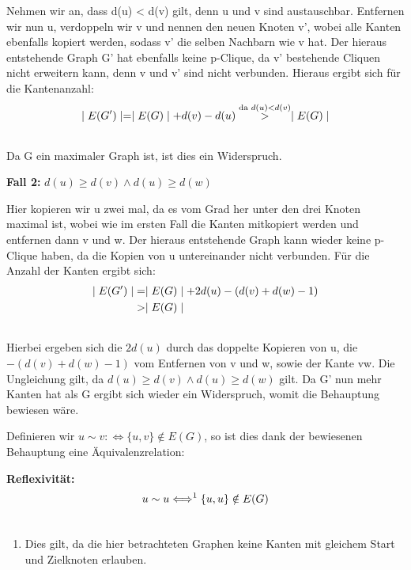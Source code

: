\documentclass[12pt, a4paper]{article}
\begin{document}
Nehmen wir an, dass d(u) \textless{} d(v) gilt, denn u und v sind austauschbar.
Entfernen wir nun u, verdoppeln wir v und nennen den neuen Knoten v', wobei alle Kanten ebenfalls kopiert werden, sodass v' die selben Nachbarn wie v hat. Der hieraus entstehende Graph G' hat ebenfalls keine p-Clique, da v' bestehende Cliquen nicht erweitern kann, denn v und v' sind nicht verbunden. Hieraus ergibt sich für die Kantenanzahl:
\begin{gather}
\begin{split}\mid E(G') \mid = \mid E(G) \mid + d(v) - d(u) \overset{\text{da } d(u) < d(v)}{>} \mid E(G) \mid\end{split}\notag\\\begin{split}\end{split}\notag
\end{gather}
Da G ein maximaler Graph ist, ist dies ein Widerspruch.

\textbf{Fall 2:} $d(u) \ge d(v) \wedge d(u) \ge d(w)$

Hier kopieren wir u zwei mal, da es vom Grad her unter den drei Knoten maximal ist, wobei wie im ersten Fall die Kanten mitkopiert werden und entfernen dann v und w. Der hieraus entstehende Graph kann wieder keine p-Clique haben, da die Kopien von u untereinander nicht verbunden. Für die Anzahl der Kanten ergibt sich:
\begin{gather}
\begin{split}\mid E(G') \mid &= \mid E(G) \mid + 2 d(u) - (d(v) + d(w) - 1) \\
&> \mid E(G) \mid\end{split}\notag\\\begin{split}\end{split}\notag
\end{gather}
Hierbei ergeben sich die $2d(u)$ durch das doppelte Kopieren von u, die $- (d(v) + d(w) - 1)$ vom Entfernen von v und w, sowie der Kante vw. Die Ungleichung gilt, da $d(u) \ge d(v) \wedge d(u) \ge d(w)$ gilt. Da G' nun mehr Kanten hat als G ergibt sich wieder ein Widerspruch, womit die Behauptung bewiesen wäre.

Definieren wir $u \sim v :\Longleftrightarrow \{ u,v \} \notin E(G)$, so ist dies dank der bewiesenen Behauptung eine Äquivalenzrelation:

\textbf{Reflexivität:}
\begin{gather}
\begin{split}u \sim u \Longleftrightarrow^1 \{ u,u \} \notin E(G)\end{split}\notag\\\begin{split}\end{split}\notag
\end{gather}\begin{enumerate}
\item {}
Dies gilt, da die hier betrachteten Graphen keine Kanten mit gleichem Start und Zielknoten erlauben.

\end{enumerate}
\end{document}
